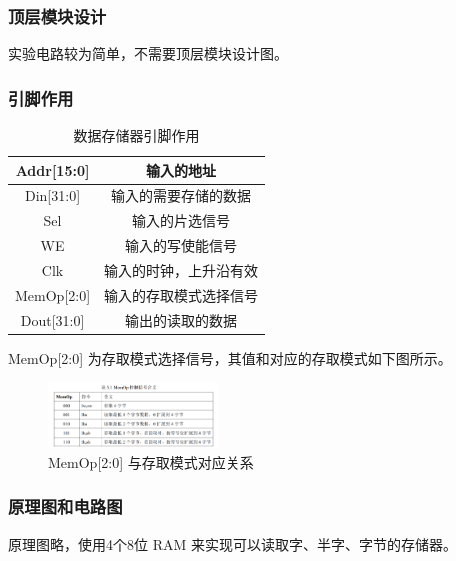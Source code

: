 \documentclass{article}
\begin{document}
    \subsubsection{顶层模块设计}
    实验电路较为简单，不需要顶层模块设计图。

    \subsubsection{引脚作用}
    \begin{table}[H]
    \centering
    \begin{tabular}{|c|c|}
        \hline
        Addr[15:0]  & 输入的地址 \\ \hline
        Din[31:0] & 输入的需要存储的数据 \\ \hline
        Sel   & 输入的片选信号 \\ \hline
        WE   & 输入的写使能信号 \\ \hline
        Clk   & 输入的时钟，上升沿有效 \\ \hline
        MemOp[2:0]   & 输入的存取模式选择信号 \\ \hline
        Dout[31:0]   & 输出的读取的数据 \\ \hline
    \end{tabular}
    \caption{数据存储器引脚作用}
    \end{table}
    MemOp[2:0] 为存取模式选择信号，其值和对应的存取模式如下图所示。
    \begin{figure}[H]
    \centering
    \includegraphics[width=0.4\textwidth]{1.2.png}
    \caption{MemOp[2:0] 与存取模式对应关系}
    \end{figure}

    \subsubsection{原理图和电路图}
    原理图略，使用4个8位 RAM 来实现可以读取字、半字、字节的存储器。
\end{document}
